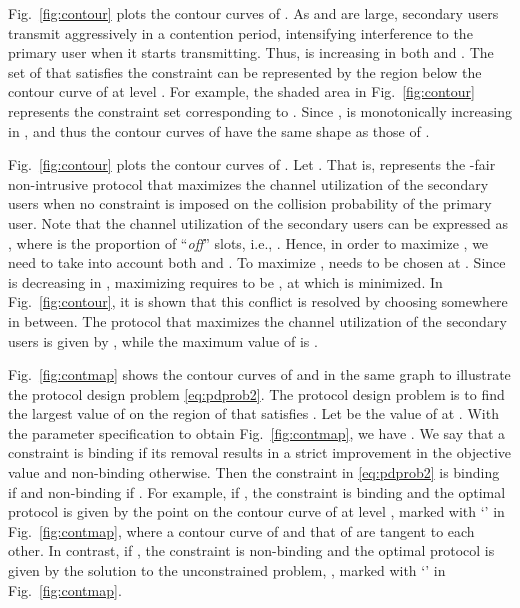 \documentclass[12pt,draftclsnofoot,onecolumn]{IEEEtran}
\begin{document}
Fig.~\ref{fig:contour} plots the contour curves of .
As  and  are large, secondary users transmit aggressively in a contention period, intensifying
interference to the primary user when it starts transmitting. Thus,  is increasing in both  and .
The set of  that satisfies the constraint  can be represented by the region below the
contour curve of  at level . For example, the shaded area
in Fig.~\ref{fig:contour} represents the constraint set corresponding to .
Since ,  is monotonically increasing
in , and thus the contour curves of  have the same shape
as those of .

Fig.~\ref{fig:contour} plots the contour curves of .
Let . That is,  represents
the -fair non-intrusive protocol that maximizes the channel utilization of the secondary users when no constraint
is imposed on the collision probability of the primary user.
Note that the channel utilization of the secondary users can be expressed as
, where  is the proportion of ``\emph{off}'' slots, i.e.,
.
Hence, in order to maximize , we need to take into account both  and .
To maximize ,  needs to be chosen at . Since
 is decreasing in , maximizing 
requires  to be , at which  is minimized. In Fig.~\ref{fig:contour},
it is shown that this conflict is resolved by choosing  somewhere in between.
The protocol that maximizes the channel utilization of the secondary users is given by
, while the maximum value of  is .

Fig.~\ref{fig:contmap} shows the contour curves of  and  in
the same graph to illustrate the protocol design problem \eqref{eq:pdprob2}.
The protocol design problem is to find
the largest value of  on the region of  that satisfies .
Let  be the value of  at .
With the parameter specification to obtain Fig.~\ref{fig:contmap}, we have .
We say that a constraint is binding if its removal results in a strict improvement
in the objective value and non-binding otherwise. Then the constraint in \eqref{eq:pdprob2}
is binding if  and non-binding if .
For example, if , the constraint is binding and the optimal protocol
is given by the point on the contour curve of  at level , marked
with `' in Fig.~\ref{fig:contmap}, where
a contour curve of  and that of  are tangent to each other.
In contrast, if , the constraint is non-binding and
the optimal protocol is given by the solution to the unconstrained problem, , marked
with `' in Fig.~\ref{fig:contmap}.
\end{document}
